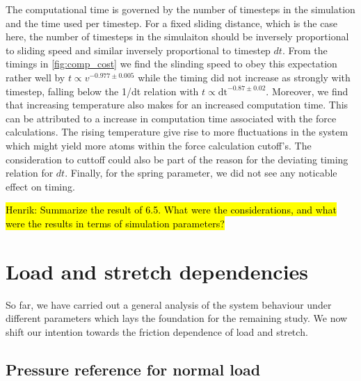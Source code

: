 The computational time is governed by the number of timesteps in the simulation
and the time used per timestep. For a fixed sliding distance, which is the case
here, the number of timesteps in the simulaiton should be inversely proportional
to sliding speed and similar inversely proportional to timestep $dt$. From the
timings in \cref{fig:comp_cost} we find the slinding speed to obey this
expectation rather well by $t \propto v^{-0.977 \pm 0.005}$ while the timing did
not increase as strongly with timestep, falling below the 1/dt relation with $t
\propto \text{dt}^{-0.87\pm 0.02}$. Moreover, we find that increasing
temperature also makes for an increased computation time. This can be attributed
to a increase in computation time associated with the force calculations. The
rising temperature give rise to more fluctuations in the system which might
yield more atoms within the force calculation cutoff's. The consideration to
cuttoff could also be part of the reason for the deviating timing relation for
$dt$. Finally, for the spring parameter, we did not see any noticable effect on
timing.



\hl{Henrik: Summarize the result of 6.5. What were the considerations, and what were the results in terms of simulation parameters?}






\section{Load and stretch dependencies}\label{sec:load_and_stretch}

So far, we have carried out a general analysis of the system behaviour under
different parameters which lays the foundation for the remaining study. We now
shift our intention towards the friction dependence of load and stretch.

\subsection{Pressure reference for normal load}

